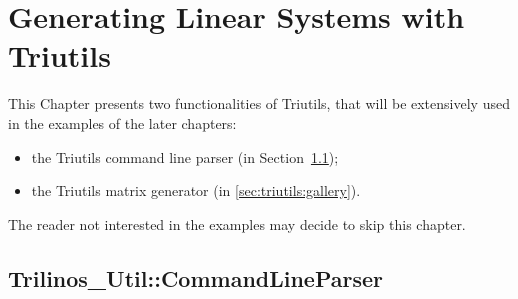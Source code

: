 % 
% 
% 
%  
%  
% 

\section{Generating Linear Systems with Triutils}
\label{chap:triutils}

This Chapter presents two functionalities of Triutils, that will be
extensively used in the examples of the later chapters: 
\begin{itemize}
\item the Triutils command line parser (in
  Section~\ref{sec:triutils:CLP});
\item the Triutils matrix generator (in \ref{sec:triutils:gallery}).
\end{itemize}
The reader not interested in the examples may decide to skip this chapter.


\subsection{Trilinos\_Util::CommandLineParser}
\label{sec:triutils:CLP}


